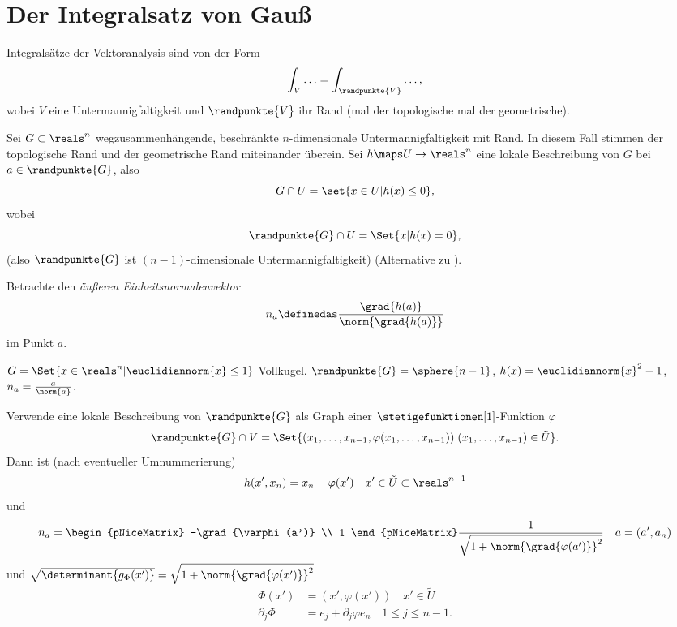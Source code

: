 \section{Der Integralsatz von Gauß}
Integralsätze der Vektoranalysis sind von der Form
\begin{equation*}
  \int_V\dotsc=\int_{\randpunkte{V}}\dotsc,
\end{equation*}
wobei \( V \) \zb eine Untermannigfaltigkeit und \( \randpunkte{V}  \) ihr Rand (mal der topologische mal der geometrische).
\begin{erinnerung*}
  Sei \( G\subset \reals^n \) wegzusammenhängende, beschränkte \( n \)-dimensionale Untermannigfaltigkeit mit Rand. In diesem Fall stimmen der topologische Rand und der geometrische Rand miteinander überein. Sei \( h\maps U\to \reals^n \) eine lokale Beschreibung von \( G \) bei \( a\in \randpunkte{G} \), also 
  \begin{equation*}
    G\cap U=\set{x\in U|h(x)\leq 0},
  \end{equation*}
  wobei
  \begin{equation*}
    \randpunkte{G}\cap U=\Set{x|h(x)=0},
  \end{equation*}
  (also \( \randpunkte{G} \) ist \( (n-1) \)-dimensionale Untermannigfaltigkeit)
  (Alternative zu ).

  Betrachte den \emph{äußeren Einheitsnormalenvektor}
  \begin{equation*}
    n_a\definedas \frac{\grad{h(a)}}{\norm{\grad{h(a)}}}
  \end{equation*}
  im Punkt \( a \).
  \begin{beispiel*}
    \( G=\Set{x\in \reals^n|\euclidiannorm{x}\leq 1} \) Vollkugel. \( \randpunkte{G}=\sphere{n-1} \), \( h(x)=\euclidiannorm{x}^2-1 \), \( n_a=\frac{a}{\norm{a}} \).
  \end{beispiel*}
  Verwende eine lokale Beschreibung von \( \randpunkte{G} \) als Graph einer \( \stetigefunktionen[1] \)-Funktion \( \varphi \)
  \begin{equation*}
    \randpunkte{G}\cap V=\Set{(x_1,\dotsc,x_{n-1},\varphi(x_1,\dotsc,x_{n-1}))|(x_1,\dotsc,x_{n-1})\in \tilde{U}}.
  \end{equation*}
  Dann ist (nach eventueller Umnummerierung)
  \begin{equation*}
    h(x',x_n)=x_n-\varphi(x')\quad x'\in \tilde{U}\subset \reals^{n-1 }
  \end{equation*}
  und
  \begin{equation*}
    n_a=\begin{pNiceMatrix} -\grad{\varphi(a')} \\ 1 \end{pNiceMatrix}\frac{1}{\sqrt{1+\norm{\grad{\varphi(a')}}^2}}\quad a=(a',a_n)
  \end{equation*}
  und \( \sqrt{\determinant{g_{\Phi}(x')}}=\sqrt{1+\norm{\grad{\varphi(x')}}^2} \)
  \begin{align*}
    \Phi(x')&=(x',\varphi(x'))\quad x'\in \tilde{U}\\
    \partial_j \Phi&=e_j+\partial_j \varphi e_n\quad 1\leq j\leq n-1.
  \end{align*}
\end{erinnerung*}

